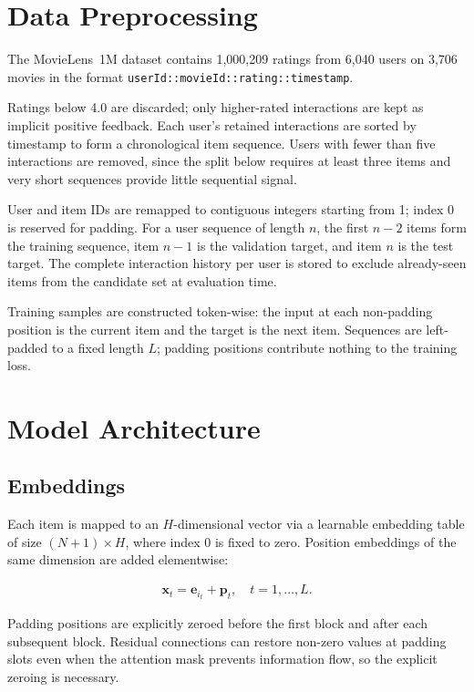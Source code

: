 \documentclass[sigconf]{acmart}
\begin{document}
\section{Data Preprocessing}

The MovieLens~1M dataset contains 1,000,209 ratings from 6,040 users on 3,706
movies in the format \texttt{userId::movieId::rating::timestamp}.

Ratings below 4.0 are discarded; only higher-rated interactions are kept as
implicit positive feedback. Each user's retained interactions are sorted by
timestamp to form a chronological item sequence. Users with fewer than five
interactions are removed, since the split below requires at least three items
and very short sequences provide little sequential signal.

User and item IDs are remapped to contiguous integers starting from 1; index 0
is reserved for padding. For a user sequence of length $n$, the first $n-2$
items form the training sequence, item $n-1$ is the validation target, and item
$n$ is the test target. The complete interaction history per user is stored to
exclude already-seen items from the candidate set at evaluation time.

Training samples are constructed token-wise: the input at each non-padding
position is the current item and the target is the next item. Sequences are
left-padded to a fixed length $L$; padding positions contribute nothing to the
training loss.


\section{Model Architecture}

\subsection{Embeddings}

Each item is mapped to an $H$-dimensional vector via a learnable embedding table
of size $(N+1) \times H$, where index 0 is fixed to zero. Position embeddings
of the same dimension are added elementwise:

\begin{align}
  \mathbf{x}_t = \mathbf{e}_{i_t} + \mathbf{p}_t, \quad t = 1, \dots, L.
\end{align}

Padding positions are explicitly zeroed before the first block and after each
subsequent block. Residual connections can restore non-zero values at padding
slots even when the attention mask prevents information flow, so the explicit
zeroing is necessary.
\end{document}
